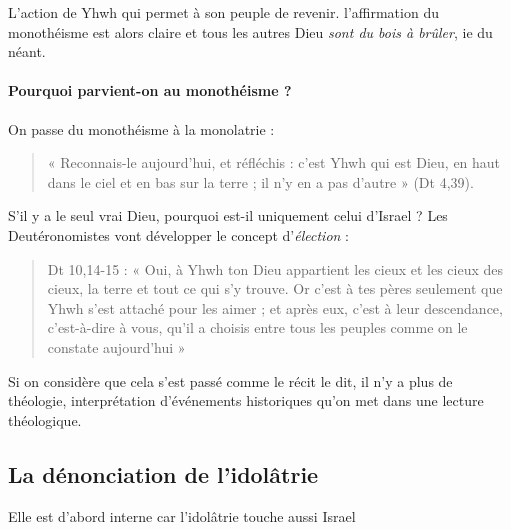 L'action de Yhwh qui permet à son peuple de revenir. l'affirmation du monothéisme est alors claire et tous les autres Dieu \textit{sont du bois à brûler}, ie du néant.


\paragraph{Pourquoi parvient-on au monothéisme ?} On passe du monothéisme à la monolatrie : 
\begin{quote}
    « Reconnais-le aujourd’hui, et réfléchis : c’est Yhwh qui est Dieu, en haut dans le ciel et en bas sur la
terre ; il n’y en a pas d’autre » (Dt 4,39).
\end{quote}

S'il y a le seul vrai Dieu, pourquoi est-il uniquement celui d'Israel ? Les Deutéronomistes vont développer le concept d'\textit{élection} :

\begin{quote}
Dt 10,14-15 : « Oui, à Yhwh ton Dieu appartient les cieux et les cieux des cieux, la terre et tout ce qui
s’y trouve. Or c’est à tes pères seulement que Yhwh s’est attaché pour les aimer ; et après eux, c’est à
leur descendance, c’est-à-dire à vous, qu’il a choisis entre tous les peuples comme on le constate
aujourd’hui »
\end{quote}

Si on considère que cela s'est passé comme le récit le dit, il n'y a plus de théologie, interprétation d'événements historiques qu'on met dans une lecture théologique.


\subsection{La dénonciation de l’idolâtrie} Elle est d'abord interne car l'idolâtrie touche aussi Israel

